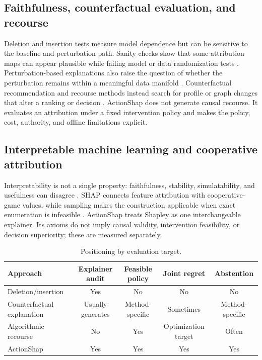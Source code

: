\documentclass[pdflatex,sn-basic,Numbered]{sn-jnl}
\theoremstyle{thmstyleone}
\theoremstyle{thmstyletwo}
\theoremstyle{thmstylethree}
\begin{document}
\subsection{Faithfulness, counterfactual evaluation, and recourse}
Deletion and insertion tests measure model dependence but can be sensitive to the baseline and perturbation path. Sanity checks show that some attribution maps can appear plausible while failing model or data randomization tests \citep{adebayo2018}. Perturbation-based explanations also raise the question of whether the perturbation remains within a meaningful data manifold \citep{hooker2019}. Counterfactual recommendation and recourse methods instead search for profile or graph changes that alter a ranking or decision \citep{ghazimatin2020,tran2021,tan2021,yao2022,baklanov2024,barkan2024,gurevitch2025,mohammadi2025,nguyen2026,wachter2017,karimi2021}. ActionShap does not generate causal recourse. It evaluates an attribution under a fixed intervention policy and makes the policy, cost, authority, and offline limitations explicit.

\subsection{Interpretable machine learning and cooperative attribution}
Interpretability is not a single property: faithfulness, stability, simulatability, and usefulness can disagree \citep{gilpin2018,arrieta2020,molnar2022,samek2017,deyoung2020}. SHAP connects feature attribution with cooperative-game values, while sampling makes the construction applicable when exact enumeration is infeasible \citep{shapley1953,castro2009,lundberg2020,covert2021}. ActionShap treats Shapley as one interchangeable explainer. Its axioms do not imply causal validity, intervention feasibility, or decision superiority; these are measured separately.

\begin{table}[t]
\centering
\small
\caption{Positioning by evaluation target.}
\label{tab:positioning}
\begin{tabular}{lcccc}
\toprule
Approach & Explainer audit & Feasible policy & Joint regret & Abstention\\
\midrule
Deletion/insertion & Yes & No & No & No\\
Counterfactual explanation & Usually generates & Method-specific & Sometimes & Method-specific\\
Algorithmic recourse & No & Yes & Optimization target & Often\\
ActionShap & Yes & Yes & Yes & Yes\\
\bottomrule
\end{tabular}
\end{table}
\end{document}
